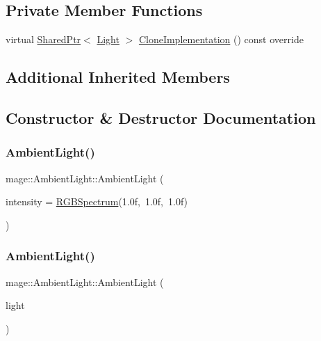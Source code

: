 \subsection*{Private Member Functions}
\begin{DoxyCompactItemize}
\item 
virtual \hyperlink{namespacemage_a1e01ae66713838a7a67d30e44c67703e}{Shared\+Ptr}$<$ \hyperlink{classmage_1_1_light}{Light} $>$ \hyperlink{classmage_1_1_ambient_light_a7f9f9a487416b0a9dce8aee226275512}{Clone\+Implementation} () const override
\end{DoxyCompactItemize}
\subsection*{Additional Inherited Members}


\subsection{Constructor \& Destructor Documentation}
\hypertarget{classmage_1_1_ambient_light_a4ae1590d03ca4e9d854bb6ef650ee126}{}\label{classmage_1_1_ambient_light_a4ae1590d03ca4e9d854bb6ef650ee126} 
\subsubsection{\texorpdfstring{Ambient\+Light()}{AmbientLight()}\hspace{0.1cm}{\footnotesize\ttfamily [1/3]}}
{\footnotesize\ttfamily mage\+::\+Ambient\+Light\+::\+Ambient\+Light (\begin{DoxyParamCaption}\item[{const \hyperlink{structmage_1_1_r_g_b_spectrum}{R\+G\+B\+Spectrum} \&}]{intensity = {\ttfamily \hyperlink{structmage_1_1_r_g_b_spectrum}{R\+G\+B\+Spectrum}(1.0f,~1.0f,~1.0f)} }\end{DoxyParamCaption})\hspace{0.3cm}{\ttfamily [explicit]}}

\hypertarget{classmage_1_1_ambient_light_a98103c5883ae43173bcf3afb522cf0a5}{}\label{classmage_1_1_ambient_light_a98103c5883ae43173bcf3afb522cf0a5} 
\subsubsection{\texorpdfstring{Ambient\+Light()}{AmbientLight()}\hspace{0.1cm}{\footnotesize\ttfamily [2/3]}}
{\footnotesize\ttfamily mage\+::\+Ambient\+Light\+::\+Ambient\+Light (\begin{DoxyParamCaption}\item[{const \hyperlink{classmage_1_1_ambient_light}{Ambient\+Light} \&}]{light }\end{DoxyParamCaption})\hspace{0.3cm}{\ttfamily [default]}}


